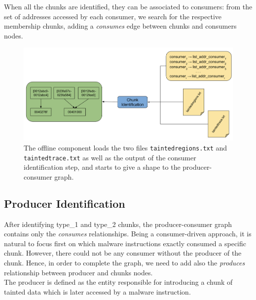 \documentclass[LaM,binding=0.6cm]{sapthesis}
\begin{document}
When all the chunks are identified, they can be associated to consumers: from the set of addresses accessed by each consumer, we search for the respective membership chunks, adding a \textit{consumes} edge between chunks and consumers nodes.

\begin{figure}[h!]
\centering
\includegraphics[scale=.45]{images/dtatracker5}
\vspace{-2mm}
\caption{The offline component loads the two files \texttt{taintedregions.txt} and \texttt{taintedtrace.txt} as well as the output of the consumer identification step, and starts to give a shape to the producer-consumer graph.}
\end{figure}

\subsection{Producer Identification}
\label{subsec:produceridentification}
After identifying type\_1 and type\_2 chunks, the producer-consumer graph contains only the \textit{consumes} relationships. Being a consumer-driven approach, it is natural to focus first on which malware instructions exactly consumed a specific chunk. However, there could not be any consumer without the producer of the chunk. Hence, in order to complete the graph, we need to add also the \textit{produces} relationship between producer and chunks nodes.\\

The producer is defined as the entity responsible for introducing a chunk of tainted data which is later accessed by a malware instruction.
\end{document}
